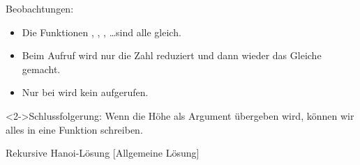 \begin{frame}
\begin{block}{Beobachtungen:}
	\begin{itemize}
		\item Die Funktionen , , , \ldots sind alle gleich.
		\item Beim Aufruf wird nur die Zahl reduziert und dann wieder das Gleiche gemacht.
		\item Nur bei  wird kein  aufgerufen.
	\end{itemize}
\end{block}
\begin{block}<2->{Schlussfolgerung: Wenn die Höhe als Argument übergeben wird, können wir alles in eine Funktion schreiben.}
\end{block}
\end{frame}

\begin{frame}
\begin{block}{Rekursive Hanoi-Lösung}
  [Allgemeine Lösung]
\end{block}
\end{frame}
